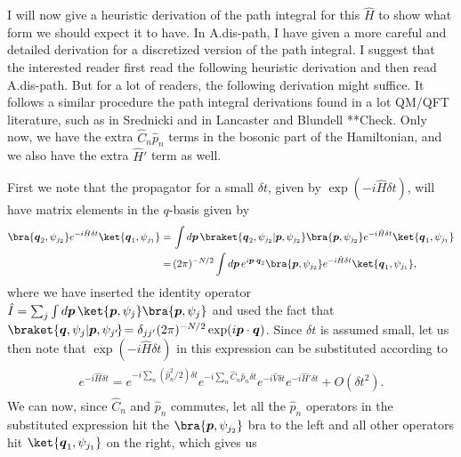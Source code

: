 \documentclass{report}
\begin{document}
I will now give a heuristic derivation of the path integral for this $\hat H$ to show what form we should expect it to have. In A.dis-path, I have given a more careful and detailed derivation for a discretized version of the path integral. I suggest that the interested reader first read the following heuristic derivation and then read A.dis-path. But for a lot of readers, the following derivation might suffice. It follows a similar procedure the path integral derivations found in a lot %
QM/QFT literature, such as in Srednicki \cite{} and in Lancaster and Blundell \cite{} **Check. Only now, we have the extra $\hat C_n \hat p_{n}$ terms in the bosonic part of the Hamiltonian, and we also have the extra $\hat H'$ term as well. 

First we note that the propagator for a small $\delta t$, given by $\exp(-i \hat H \delta t)$, will have matrix elements in the $q$-basis given by
\begin{align}
\begin{aligned}
	\bra{\boldsymbol{q}_2, \psi_{j_2}} e^{-i \hat H \delta t} \ket{\boldsymbol{q}_1 , \psi_{j_1}} 
	=&\,
		\int d \boldsymbol{p}\, 
		\braket{\boldsymbol{q}_2, \psi_{j_2} | \boldsymbol{p}, \psi_{j_2}} 
		\bra{\boldsymbol{p}, \psi_{j_2}}  e^{-i \hat H \delta t} \ket{\boldsymbol{q}_1, \psi_{j_1}} 
	\\=&\,
		(2\pi)^{-N/2}
		\int d \boldsymbol{p}\, 
		e^{i \boldsymbol{p} \cdot \boldsymbol{q}_2}
		\bra{\boldsymbol{p}, \psi_{j_2}}  e^{-i \hat H \delta t} \ket{\boldsymbol{q}_1, \psi_{j_1}},
\end{aligned}
\end{align} 
where we have inserted the identity operator $\hat I = \sum_j \int d\boldsymbol{p}\,\ket{\boldsymbol{p}, \psi_j}\bra{\boldsymbol{p}, \psi_j}$ and used the fact that $\braket{\boldsymbol{q}, \psi_{j} | \boldsymbol{p}, \psi_{j'}\!}\! = \delta_{j j'}(2\pi)^{-N/2}\exp(i \boldsymbol{p} \cdot \boldsymbol{q})$. Since $\delta t$ is assumed small, let us then note that $\exp(-i \hat H \delta t)$ in this expression can be substituted according to
\begin{align}
\begin{aligned}
	e^{-i \hat H \delta t} =
		e^{-i \sum_n (\hat p_n^2 / 2) \delta t} 
		e^{-i \sum_n \hat C_n \hat p_n \delta t} 
		e^{-i \hat V \delta t} 
		e^{-i \hat H' \delta t} 
		+ O(\delta t^2).
\end{aligned}
\end{align} 
We can now, since $\hat C_n$ and $\hat p_n$ commutes, let all the $\hat p_n$ operators in the substituted expression hit the $\bra{\boldsymbol{p}, \psi_{j_2}}$ bra to the left and all other operators hit $\ket{\boldsymbol{q}_1, \psi_{j_1}}$ on the right, which gives us
\end{document}
